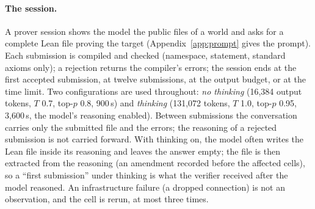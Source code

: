 \documentclass[11pt]{article}
\begin{document}
\paragraph{The session.} A prover session shows the model the public files
of a world and asks for a complete Lean file proving the target
(Appendix~\ref{app:prompt} gives the prompt). Each submission is compiled
and checked (namespace, statement, standard axioms only); a rejection
returns the compiler's errors; the session ends at the first accepted
submission, at twelve submissions, at the output budget, or at the time
limit. Two configurations are used throughout: \emph{no thinking} (16,384
output tokens, $T$ 0.7, top-$p$ 0.8, 900\,s) and \emph{thinking} (131,072
tokens, $T$ 1.0, top-$p$ 0.95, 3,600\,s, the model's reasoning enabled).
Between submissions the conversation carries only the submitted file and
the errors; the reasoning of a rejected submission is not carried forward.
With thinking on, the model often writes the Lean file inside its
reasoning and leaves the answer empty; the file is then extracted from the
reasoning (an amendment recorded before the affected cells), so a ``first
submission'' under thinking is what the verifier received after the model
reasoned. An infrastructure failure (a dropped connection) is not an
observation, and the cell is rerun, at most three times.
\end{document}
